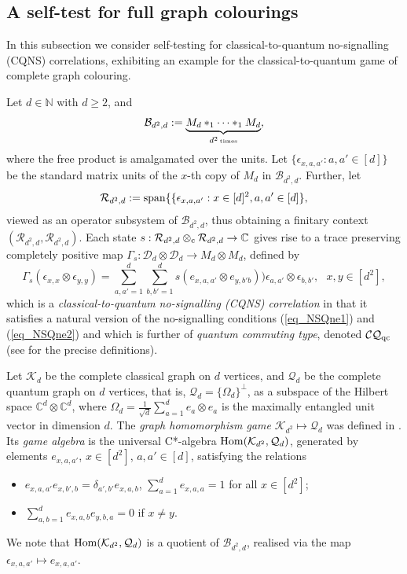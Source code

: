 \documentclass[11pt]{amsart}
\theoremstyle{definition}
\newcommand{\cl}[1]{\mathcal{#1}}
\newcommand{\bb}[1]{\mathbb{#1}}
\begin{document}
\subsection{A self-test for full graph colourings}\label{s:qg}

In this subsection we consider self-testing for 
classical-to-quantum no-signalling (CQNS) correlations, 
exhibiting an example for the classical-to-quantum game 
of complete graph colouring. 

Let $d\in \bb{N}$ with $d\geq 2$, and
$$\cl B_{d^2,d} := \underbrace{M_d\ast_1 \cdots\ast_1 M_d}_{d^2 \hspace{0.05cm} \mbox{\tiny times}},$$ 
where the free product is amalgamated over the units.
Let $\{\epsilon_{x,a,a'} : a,a'\in [d]\}$ be the standard matrix units of 
the $x$-th copy of $M_d$ in $\cl B_{d^2,d}$. 
Further, let 
\begin{equation}\label{eq_Rd2d}
\cl R_{d^2,d} := {\rm span}\{\{\epsilon_{x,a,a'} : x\in [d]^2, a,a'\in [d]\},
\end{equation}
viewed as an operator subsystem of $\cl B_{d^2,d}$, 
thus obtaining a finitary context $(\cl R_{d^2,d},\cl R_{d^2,d})$. 
Each state $s : \cl R_{d^2,d}\otimes_{\rm c} \cl R_{d^2,d} \to \bb{C}$
gives rise to a trace preserving completely positive 
map $\Gamma_s : \cl D_d\otimes \cl D_d\to M_d\otimes M_d$, 
defined by 
$$\Gamma_s(\epsilon_{x,x}\otimes\epsilon_{y,y}) 
= \sum_{a,a'=1}^d \sum_{b,b'=1}^d s(e_{x,a,a'}\otimes e_{y,b'b}))\epsilon_{a,a'}\otimes\epsilon_{b,b'}, 
\ \ \ x,y\in [d^2],$$
which is a \emph{classical-to-quantum no-signalling (CQNS) correlation}
in that it 
satisfies a natural version of the no-signalling conditions 
(\ref{eq_NSQne1}) and (\ref{eq_NSQne2}) 
and which is further of \emph{quantum commuting type}, denoted $\cl{CQ}_{\rm qc}$
(see \cite[Section 7]{tt-QNS} for the precise definitions). 


Let $\cl K_d$ be the complete classical graph on $d$ vertices, and 
$\cl Q_d$ be the complete quantum graph on $d$ vertices, that is, 
$\cl Q_d = \{\Omega_d\}^\perp$, as a 
subspace of the Hilbert space $\mathbb C^d\otimes\mathbb C^d$, 
where $\Omega_d = \frac{1}{\sqrt{d}} \sum_{a=1}^d e_a\otimes e_a$
is the maximally entangled unit vector in dimension $d$. 
The \emph{graph homomorphism game} $\cl K_{d^2} \mapsto \cl Q_d$
was defined in \cite{tt-QNS}. Its \emph{game algebra} is the 
universal C*-algebra ${\rm Hom}(\cl K_{d^2}, \cl Q_d)$, 
generated by elements $e_{x,a,a'}$, $x\in[d^2]$, $a,a'\in[d]$,
satisfying the relations
\begin{itemize}
\item[(i)] $e_{x,a,a'}e_{x,b',b}=\delta_{a',b'}e_{x,a,b}$, $\sum_{a=1}^d e_{x,a,a}=1$ for all $x\in[d^2]$;
\item[(ii)] $\sum_{a,b=1}^d e_{x,a,b}e_{y,b,a}=0$ if $x\ne y$.
\end{itemize}
We note that ${\rm Hom}(\cl K_{d^2}, \cl Q_d)$ is a
quotient of $\cl B_{d^2,d}$, realised via the map 
$\epsilon_{x,a,a'}\mapsto e_{x,a,a'}$. 
\end{document}

